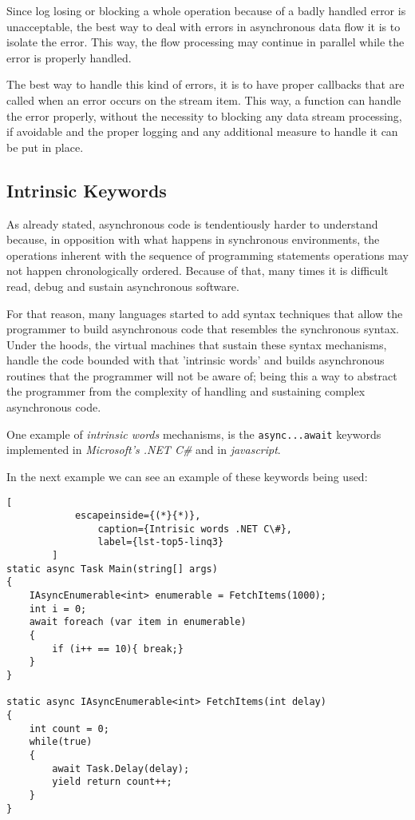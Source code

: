 	Since log losing or blocking a whole operation because of a badly handled error is unacceptable, the best way to deal with errors in asynchronous data flow it is to isolate the error. This way, the flow processing may continue in parallel while the error is properly handled.
	
	The best way to handle this kind of errors, it is to have proper callbacks that are called when an error occurs on the stream item. This way, a function can handle the error properly, without the necessity to blocking any data stream processing, if avoidable and the proper logging and any additional measure to handle it can be put in place.
	\clearpage
	

	\subsection{Intrinsic Keywords} 
	
	As already stated, asynchronous code is tendentiously harder to understand because, in opposition with what happens in synchronous environments, the operations inherent with the sequence of programming statements operations may not happen chronologically ordered. 
	Because of that, many times it is difficult read, debug and sustain asynchronous software. 

	For that reason, many languages started to add syntax techniques that allow the programmer to build asynchronous code that resembles the synchronous syntax.
	Under the hoods, the virtual machines that sustain these syntax mechanisms, handle the code bounded with that 'intrinsic words' and builds asynchronous routines that the programmer will not be aware of;
	being this a way to abstract the programmer from the complexity of handling and sustaining complex asynchronous code. 

	One example of \textit{intrinsic words} mechanisms, is the \texttt{async...await} keywords implemented in \textit{Microsoft's .NET C\#} and in \textit{javascript}. 
	
	In the next example we can see an example of these keywords being used:

	\begin{center}
		\lstset{basicstyle=\scriptsize\ttfamily,frame=bottomline}
		\begin{lstlisting}[
			escapeinside={(*}{*)},
				caption={Intrisic words .NET C\#},
				label={lst-top5-linq3}
		]
static async Task Main(string[] args)
{
	IAsyncEnumerable<int> enumerable = FetchItems(1000);
	int i = 0;
	await foreach (var item in enumerable)
	{
		if (i++ == 10){ break;}
	}
}

static async IAsyncEnumerable<int> FetchItems(int delay)
{
	int count = 0;
	while(true)
	{
		await Task.Delay(delay);
		yield return count++;
	}
}
		\end{lstlisting}
	\end{center}


